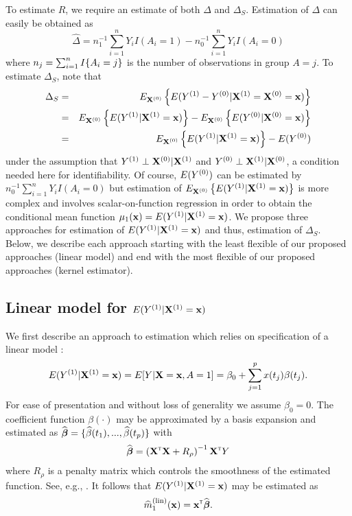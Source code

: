 \documentclass[useAMS,usenatbib,referee]{biom}
\begin{document}
To estimate $R$, we require an estimate of both $\Delta$ and $\Delta_S$. Estimation of $\Delta$ can easily be obtained as $$\hat \Delta = n_1^{-1}\sum_{i=1}^n Y_i I(A_i = 1) - n_0^{-1}\sum_{i=1}^n Y_i I(A_i = 0)$$ where $n_j = \sum_{i=1}^n I\{A_i = j\}$ is the number of observations in group $A = j$. To estimate $\Delta_S$, note that \begin{eqnarray*}
\Delta_S &=& E_{{\bf X}^{(0)}} \left \{ E(Y^{(1)}-Y^{(0)} | {\bf X}^{(1)} = {\bf X}^{(0)}={\bf x})\right \} \\
&=& E_{{\bf X}^{(0)}}\left \{ E(Y^{(1)}| {\bf X}^{(1)} ={\bf x})\right \} - E_{{\bf X}^{(0)}}\left \{ E(Y^{(0)} |  {\bf X}^{(0)}={\bf x}) \right \}\\
&=& E_{{\bf X}^{(0)}}\left \{ E(Y^{(1)}| {\bf X}^{(1)} ={\bf x})\right \} - E(Y^{(0)})
\end{eqnarray*}
under the assumption that $Y^{(1)} \perp {\bf X} ^{(0)} | {\bf X} ^{(1)}$ and $Y^{(0)} \perp {\bf X} ^{(1)} | {\bf X} ^{(0)}$, a condition needed here for identifiability. Of course, $E(Y^{(0)})$ can be estimated by $n_0^{-1}\sum_{i=1}^n Y_i I(A_i = 0)$ but estimation of $E_{{\bf X}^{(0)}}\left \{ E(Y^{(1)}| {\bf X}^{(1)} ={\bf x})\right \}$ is more complex and involves scalar-on-function regression in order to obtain the conditional mean function $\mu_1({\bf x}) = E(Y^{(1)}| {\bf X}^{(1)} ={\bf x})$. We propose three approaches for estimation of $E(Y^{(1)}| {\bf X}^{(1)} ={\bf x})$ and thus, estimation of $\Delta_S$. Below, we describe each approach starting with the least flexible of our proposed approaches (linear model) and end with the most flexible of our proposed approaches (kernel estimator). %

\subsection{Linear model for $E(Y^{(1)}| {\bf X}^{(1)} ={\bf x})$ \label{linearsection}}

We first describe an approach to estimation which relies on specification of a linear model \citep{Goldsmith2011}:
\begin{align}
    E(Y\sone| \bX\sone =\bx) = E[Y | \bX = \bx, A = 1] = \beta_0 + \sumjp x(t_j) \beta(t_j). \label{linear}
\end{align}
For ease of presentation and without loss of generality we assume $\beta_0 = 0$. The coefficient function $\beta(\cdot)$ may be approximated by a basis expansion and estimated as ${\widehat{\boldsymbol{\beta}}} = \{{\widehat\beta}(t_1), ..., {\widehat\beta}(t_p)\}$ with
\begin{align}
    {\widehat{\boldsymbol{\beta}}} = \left({\bf X}^{{\sf \scriptscriptstyle{T}}}{\bf X} + R_\rho\right)^{-1}{\bf X}^{{\sf \scriptscriptstyle{T}}} Y
\end{align}
where $R_\rho$ is a penalty matrix which controls the smoothness of the estimated function. See, e.g., \citep{crambes2009smoothing, Reiss2017b, Wood2015}.
It follows that $E(Y^{(1)}| {\bf X}^{(1)} ={\bf x})$ may be estimated as
\begin{equation*}
    \widehat{m}_1^{(\text{lin})}({\bf x}) = {\bf x}^{{\sf \scriptscriptstyle{T}}}{\widehat{\boldsymbol{\beta}}}.
\end{equation*}
\end{document}
